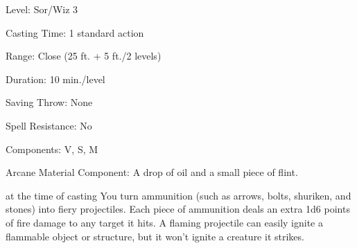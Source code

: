 
\begin{description*}
\item[Level:] Sor/Wiz 3
\item[Casting Time:] 1 standard action
\item[Range:] Close (25 ft. + 5 ft./2 levels)
\item[Duration:] 10 min./level
\item[Saving Throw:] None
\item[Spell Resistance:] No
\item[Components:] V, S, M
\item[Arcane Material Component:] A drop of oil and a small piece of flint.
\end{description*}

at the time of casting
You turn ammunition (such as arrows, bolts, shuriken, and stones) into fiery projectiles.
Each piece of ammunition deals an extra 1d6 points of fire damage to any target
it hits. A flaming projectile can easily ignite a flammable object or structure,
but it won't ignite a creature it strikes.